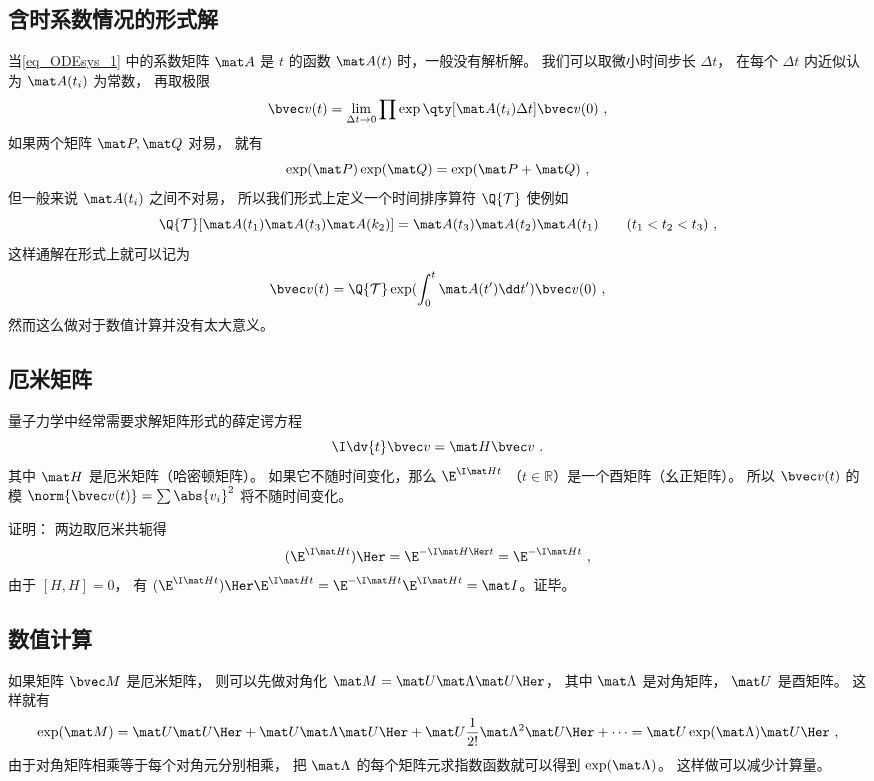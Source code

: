 \subsection{含时系数情况的形式解}
当\autoref{eq_ODEsys_1} 中的系数矩阵 $\mat A$ 是 $t$ 的函数 $\mat A(t)$ 时，一般没有解析解。 我们可以取微小时间步长 $\Delta t$， 在每个 $\Delta t$ 内近似认为 $\mat A(t_i)$ 为常数， 再取极限
\begin{equation}
\bvec v(t) = \lim_{\Delta t \to 0} \prod \exp\qty[\mat A(t_i)\Delta t] \bvec v(0)~,
\end{equation}
如果两个矩阵 $\mat P, \mat Q$ 对易， 就有
\begin{equation}
\exp(\mat P)\exp(\mat Q) = \exp(\mat P + \mat Q)~,
\end{equation}
但一般来说 $\mat A(t_i)$ 之间不对易， 所以我们形式上定义一个时间排序算符 $\Q{\mathcal T}$ 使例如
\begin{equation}
\Q {\mathcal T} [\mat A(t_1) \mat A(t_3) \mat A(k_2)] = \mat A(t_3) \mat A(t_2) \mat A(t_1) \qquad ( t_1 < t_2 < t_3 )~,
\end{equation}
这样通解在形式上就可以记为
\begin{equation}\label{eq_ODEsys_3}
\bvec v(t) = \Q {\mathcal T} \exp(\int_0^ t \mat A(t')\dd t') \bvec v(0)~,
\end{equation}
然而这么做对于数值计算并没有太大意义。

\subsection{厄米矩阵}
量子力学中经常需要求解矩阵形式的薛定谔方程
\begin{equation}
\I \dv{t} \bvec v = \mat H \bvec v~.
\end{equation}
其中 $\mat H$ 是厄米矩阵（哈密顿矩阵）。 如果它不随时间变化，那么 $\E^{\I \mat H t}$ （$t\in \mathbb R$）是一个酉矩阵（幺正矩阵）。 所以 $\bvec v(t)$ 的模 $\norm{\bvec v(t)} = \sum \abs{v_i}^2$ 将不随时间变化。

证明： 两边取厄米共轭得
\begin{equation}
(\E^{\I \mat H t})\Her = \E^{-\I \mat H\Her t} = \E^{-\I \mat H t}~,
\end{equation}
由于 $[H,H] = 0$， 有 $(\E^{\I \mat H t})\Her \E^{\I \mat H t} = \E^{-\I \mat H t}\E^{\I \mat H t} = \mat I$。证毕。

\subsection{数值计算}
如果矩阵 $\bvec M$ 是厄米矩阵， 则可以先做对角化 $\mat M = \mat U \mat \Lambda \mat U\Her$， 其中 $\mat \Lambda$ 是对角矩阵， $\mat U$ 是酉矩阵。 这样就有
\begin{equation}
\exp(\mat M) = \mat U \mat U\Her + \mat U\mat \Lambda\mat U\Her + \mat U\frac1{2!} \mat \Lambda^2 \mat U\Her + \dots = \mat U \exp(\mat \Lambda) \mat U\Her~,
\end{equation}
由于对角矩阵相乘等于每个对角元分别相乘， 把 $\mat\Lambda$ 的每个矩阵元求指数函数就可以得到 $\exp(\mat \Lambda)$。 这样做可以减少计算量。

